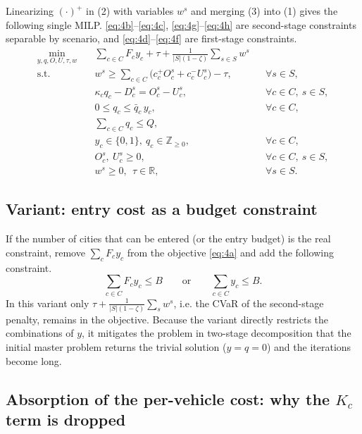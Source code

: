 \documentclass[10pt,a4paper]{article}
\begin{document}
Linearizing $(\cdot)^+$ in (2) with variables $w^s$ and merging (3) into (1) gives the following single MILP. \eqref{eq:4b}--\eqref{eq:4c}, \eqref{eq:4g}--\eqref{eq:4h} are second-stage constraints separable by scenario, and \eqref{eq:4d}--\eqref{eq:4f} are first-stage constraints.
\begin{subequations}\label{eq:ext}
\begin{align}
\min_{y,q,O,U,\tau,w}\quad
 & \sum_{c\in C}F_c y_c+\tau+\frac{1}{|S|(1-\zeta)}\sum_{s\in S}w^s \label{eq:4a}\\
\text{s.t.}\quad
 & w^s\ge\sum_{c\in C}\big(c_c^+O_c^s+c_c^-U_c^s\big)-\tau, && \forall s\in S, \label{eq:4b}\\
 & \kappa_c q_c-D_c^s=O_c^s-U_c^s, && \forall c\in C,\ s\in S, \label{eq:4c}\\
 & 0\le q_c\le\bar q_c\,y_c, && \forall c\in C, \label{eq:4d}\\
 & \sum_{c\in C}q_c\le Q, \label{eq:4e}\\
 & y_c\in\{0,1\},\ q_c\in\mathbb Z_{\ge0}, && \forall c\in C, \label{eq:4f}\\
 & O_c^s,\ U_c^s\ge 0, && \forall c\in C,\ s\in S, \label{eq:4g}\\
 & w^s\ge 0,\ \ \tau\in\mathbb R, && \forall s\in S. \label{eq:4h}
\end{align}
\end{subequations}

\subsection{Variant: entry cost as a budget constraint}

If the number of cities that can be entered (or the entry budget) is the real constraint, remove $\sum_c F_c y_c$ from the objective \eqref{eq:4a} and add the following constraint.
\begin{equation}\label{eq:budget}
\sum_{c\in C}F_c y_c\le B \qquad\text{or}\qquad \sum_{c\in C}y_c\le B.
\end{equation}
In this variant only $\tau+\frac{1}{|S|(1-\zeta)}\sum_s w^s$, i.e. the CVaR of the second-stage penalty, remains in the objective. Because the variant directly restricts the combinations of $y$, it mitigates the problem in two-stage decomposition that the initial master problem returns the trivial solution ($y=q=0$) and the iterations become long.

\subsection{Absorption of the per-vehicle cost: why the $K_c$ term is dropped}\label{sec:absorb}
\end{document}
